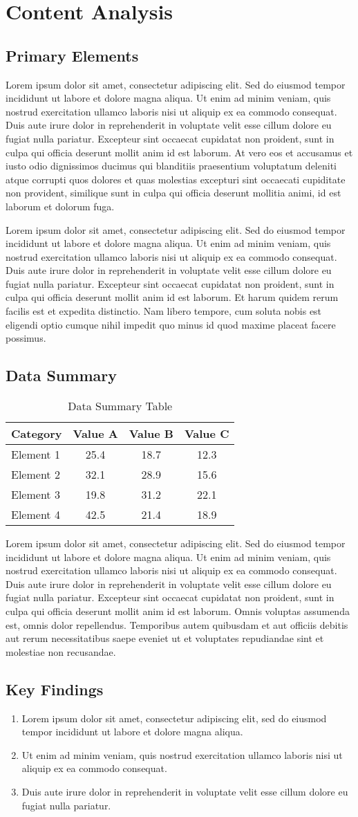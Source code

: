 \documentclass[11pt,a4paper]{article}
\newcommand{\loremtext}[1]{%
  Lorem ipsum dolor sit amet, consectetur adipiscing elit. Sed do eiusmod tempor incididunt ut labore et dolore magna aliqua. Ut enim ad minim veniam, quis nostrud exercitation ullamco laboris nisi ut aliquip ex ea commodo consequat. Duis aute irure dolor in reprehenderit in voluptate velit esse cillum dolore eu fugiat nulla pariatur. Excepteur sint occaecat cupidatat non proident, sunt in culpa qui officia deserunt mollit anim id est laborum.%
}
\begin{document}
\section{Content Analysis}

\subsection{Primary Elements}

\loremtext{3} At vero eos et accusamus et iusto odio dignissimos ducimus qui blanditiis praesentium voluptatum deleniti atque corrupti quos dolores et quas molestias excepturi sint occaecati cupiditate non provident, similique sunt in culpa qui officia deserunt mollitia animi, id est laborum et dolorum fuga.

\loremtext{4} Et harum quidem rerum facilis est et expedita distinctio. Nam libero tempore, cum soluta nobis est eligendi optio cumque nihil impedit quo minus id quod maxime placeat facere possimus.

\subsection{Data Summary}

\begin{table}[h]
\centering
\begin{tabular}{|l|c|c|c|}
\hline
\textbf{Category} & \textbf{Value A} & \textbf{Value B} & \textbf{Value C} \\
\hline
Element 1 & 25.4 & 18.7 & 12.3 \\
\hline
Element 2 & 32.1 & 28.9 & 15.6 \\
\hline
Element 3 & 19.8 & 31.2 & 22.1 \\
\hline
Element 4 & 42.5 & 21.4 & 18.9 \\
\hline
\end{tabular}
\caption{Data Summary Table}
\end{table}

\loremtext{5} Omnis voluptas assumenda est, omnis dolor repellendus. Temporibus autem quibusdam et aut officiis debitis aut rerum necessitatibus saepe eveniet ut et voluptates repudiandae sint et molestiae non recusandae.

\subsection{Key Findings}

\begin{enumerate}
  \item Lorem ipsum dolor sit amet, consectetur adipiscing elit, sed do eiusmod tempor incididunt ut labore et dolore magna aliqua.
  \item Ut enim ad minim veniam, quis nostrud exercitation ullamco laboris nisi ut aliquip ex ea commodo consequat.
  \item Duis aute irure dolor in reprehenderit in voluptate velit esse cillum dolore eu fugiat nulla pariatur.
\end{enumerate}
\end{document}

